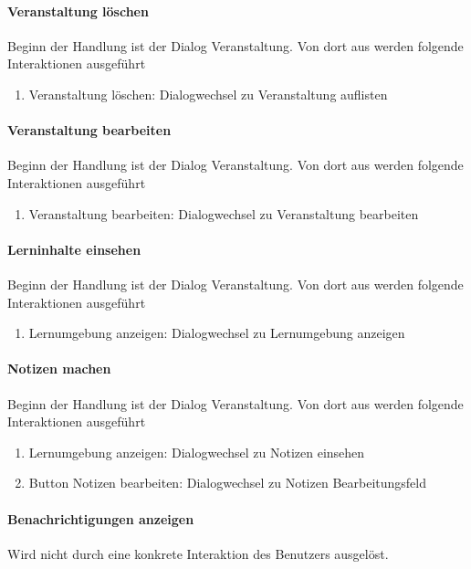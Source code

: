 \documentclass[12pt,a4paper]{article}
\begin{document}
{\paragraph{Veranstaltung löschen}
Beginn der Handlung ist der Dialog \glqq Veranstaltung\grqq. Von dort aus werden folgende Interaktionen ausgeführt
\begin{enumerate}
\item \glqq Veranstaltung löschen\grqq: Dialogwechsel zu \glqq Veranstaltung auflisten \grqq
\end{enumerate}

\paragraph{Veranstaltung bearbeiten}
Beginn der Handlung ist der Dialog \glqq Veranstaltung\grqq. Von dort aus werden folgende Interaktionen ausgeführt
\begin{enumerate}
\item \glqq Veranstaltung bearbeiten\grqq: Dialogwechsel zu \glqq Veranstaltung bearbeiten \grqq
\end{enumerate}

\paragraph{Lerninhalte einsehen}
Beginn der Handlung ist der Dialog \glqq Veranstaltung\grqq. Von dort aus werden folgende Interaktionen ausgeführt
\begin{enumerate}
\item \glqq Lernumgebung anzeigen\grqq: Dialogwechsel zu \glqq Lernumgebung anzeigen\grqq
\end{enumerate}

\paragraph{Notizen machen}
Beginn der Handlung ist der Dialog \glqq Veranstaltung\grqq. Von dort aus werden folgende Interaktionen ausgeführt
\begin{enumerate}
\item \glqq Lernumgebung anzeigen\grqq: Dialogwechsel zu \glqq Notizen einsehen\grqq
\item \glqq Button Notizen bearbeiten\grqq: Dialogwechsel zu \glqq Notizen Bearbeitungsfeld\grqq
\end{enumerate}

\paragraph{Benachrichtigungen anzeigen}
Wird nicht durch eine konkrete Interaktion des Benutzers ausgelöst.

}
\end{document}
